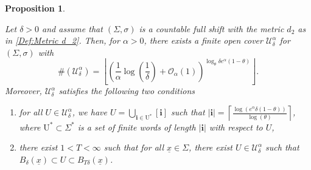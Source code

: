 \documentclass[10pt,a4paper]{amsart}
\newtheorem{proposition}{Proposition}
\def\U{\ensuremath{\mathcal U}}
\def\st{such that }
\def\ulx{\underline{x}}
\begin{document}
\begin{proposition}\label{Lemma:Totally bounded in Full shift d_2}
   
     Let $\delta>0$ and assume that $(\Sigma,\sigma)$ is a countable full shift with the metric $d_2$ as in \eqref{Def:Metric d_2}. Then, for $\alpha>0$, there exists a finite open cover $\U_{\delta}^{\alpha}$ for $(\Sigma,\sigma)$ with $$\#(\U_{\delta}^{\alpha})=\left\lfloor\left( \frac{1}{\alpha} \log \left(\frac{1}{\delta}\right)+\mathcal{O}_\alpha(1)\right) ^ { \log_\theta{\delta e^\alpha(1-\theta)}}\right\rfloor.$$
    Moreover, $\U_{\delta}^{\alpha}$ satisfies the following two conditions
\begin{enumerate}
    \item for all $U\in \U_{\delta}^{\alpha}$, we have $U=\bigcup_{\mathbf{i}\in \mathrm{U^*}}[\mathbf{i}]$ \st $|\mathbf{i}|= \left\lceil\frac{\log(e^{\alpha}\delta(1-\theta))}{\log(\theta)}\right\rceil$, where $\mathrm{U^*}\subset\Sigma^*$ is a set of finite words of length $|\mathbf{i}|$ with respect to $U$,
    \item there exist $1<T<\infty$ \st for all $\ulx\in \Sigma$, there exist  $U\in \U_{\delta}^{\alpha}$ \st $B_{\delta}(\ulx)\subset U \subset B_{T\delta}(\ulx)$.
\end{enumerate}
    
\end{proposition}
\end{document}
